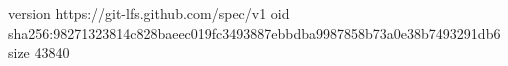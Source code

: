 version https://git-lfs.github.com/spec/v1
oid sha256:98271323814c828baeec019fc3493887ebbdba9987858b73a0e38b7493291db6
size 43840
